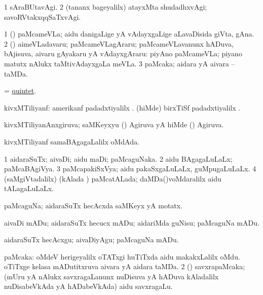 \bentry
{}
\gl{\kirxvi}
\bmng
\bnum
\num{1} sAraBUtavAgi. 
\num{2} (tananx bageyalilx) atayxMta shudadhxvAgi; savoRVtakxqqSaTxvAgi. 
\enum
\emng
\eentry

\bentry
{}
\gl{\nA}
\bmng
\bnum
\num{1} (\saM) paMcameVLa; aidu danigaLige yA vAdayxgaLige aLavaDisida giVta, gAna. 
\num{2} (\saM) aimeVLadavaru; paMcameVLagAraru; paMcameVLavanunx hADuva, bAjisuva, aivaru gAyakaru yA vAdayxgAraru:  piyAno paMcameVLa; piyano matutx nAlukx taMtivAdayxgaLa meVLa. 
\num{3} paMcaka; aidara yA aivara -- taMDa. 
\enum
\emng
\eentry

\bentry
{}
\gl{\nA}
\bmng
= \hyperlink{quintet}{quintet}. 
\emng
\eentry

\bentry
{}
\gl{\nA}
\bmng
kivxMTiliyanf: 
\banum
{} amerikanf padadxtiyalilx . 
 (hiMde) birxTiSf padadxtiyalilx . 
\eanum
\emng
\eentry

\bentry
{}
\gl{\gu}
\bmng
kivxMTiliyanAnxgiruva; saMKeyxyu (\ame)  Agiruva yA hiMde (\birx)  Agiruva. 
\emng
\eentry

\bentry
{}
\gl{\nA}
\expl{}
\bmng
kivxMTiliyanf samaBAgagaLalilx oMdAda. 
\emng
\eentry

\bentry
{}
\gl{\gu}
\bmng
\bnum
\num{1} aidaraSuTx; aivaDi; aidu maDi; paMcaguNaka. 
\num{2} aidu BAgagaLuLaLx; paMcaBAgiVya. 
\num{3} paMcapakiSxVya; aidu pakaSxgaLuLaLx, guMpugaLuLaLx. 
\num{4} (saMgiVtadalilx) (kAlada \vi) paMcatALada; daMDa()voMdaralilx aidu tALagaLuLaLx. 
\enum
\emng
\eentry

\bentry
{}
\gl{\nA}
\bmng
paMcaguNa; aidaraSuTx hecAcxda saMKeyx yA motatx. 
\emng
\eentry

\bentry
{}
\gl{\sakirx}
\bmng
aivaDi mADu; aidaraSuTx hecucx mADu; aidariMda guNisu; paMcaguNa mADu. 
\emng

\noindent
\gl{\akirx}
\bmng
aidaraSuTx hecAcxgu; aivaDiyAgu; paMcaguNa mADu. 
\emng
\eentry

\bentry
{}
\gl{\nA}
\bmng
\bnum
{} paMcaka: 
\banum
{} oMdeV herigeyalilx oTATxgi huTiTxda aidu makakxLalilx oMdu. 
 oTiTxge kelasa mADutitxruva aivara yA aidara taMDa. 
\eanum
\numie
\num{2} (\saM) savxrapaMcaka; (mUru yA nAlukx savxragaLanunx nuDisuva yA hADuva kAladalilx nuDisabeVkAda yA hADabeVkAda) aidu savxragaLu. 
\enum
\emng
\eentry

